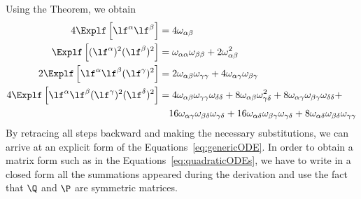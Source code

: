 Using the Theorem, we obtain
\begin{align*}
  4 \Explf  \left[\lf^\alpha \lf^\beta \right] &= 4\omega_{\alpha\beta}\\
  \Explf  \left[(\lf^\alpha)^2 (\lf^\beta)^2 \right] 
  &= \omega_{\alpha\alpha}  \omega_{\beta\beta} + 2 \omega_{\alpha\beta}^2 \\
  2\Explf  \left[\lf^\alpha \lf^\beta (\lf^\gamma)^2\right] 
  &= 2 \omega_{\alpha\beta}\omega_{\gamma\gamma} + 4 \omega_{\alpha\gamma}\omega_{\beta\gamma}\\
  4\Explf  \left[\lf^\alpha \lf^\beta (\lf^\gamma)^2 (\lf^\delta)^2\right] 
  &= 4\omega_{\alpha\beta}\omega_{\gamma\gamma}\omega_{\delta\delta} + 8\omega_{\alpha\beta}\omega_{\gamma\delta}^2 + 8\omega_{\alpha\gamma}\omega_{\beta\gamma}\omega_{\delta\delta} +\\
  &\quad16\omega_{\alpha\gamma}\omega_{\beta\delta}\omega_{\gamma\delta}+16\omega_{\alpha\delta}\omega_{\beta\gamma}\omega_{\gamma\delta} + 8\omega_{\alpha\delta}\omega_{\beta\delta}\omega_{\gamma\gamma}
\end{align*}
By retracing all steps backward and making the necessary substitutions,
we can arrive at an explicit form of the Equations~\eqref{eq:genericODE}. In order
to obtain a matrix form such as in the Equations~\eqref{eq:quadraticODEs}, 
we have to write in a closed form all the summations appeared during the derivation
and use the fact that \(\Q\) and \(\P\) are symmetric matrices.